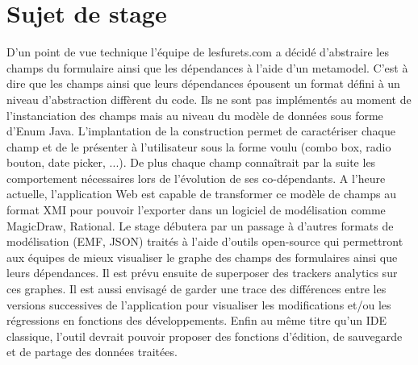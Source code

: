 \chapter{Sujet de stage}
D’un point de vue technique l’équipe de lesfurets.com a décidé d’abstraire les champs du formulaire ainsi que les dépendances à l’aide d'un metamodel. C'est à dire que les champs ainsi que leurs dépendances épousent un format défini à un niveau d'abstraction diffèrent du code. Ils ne sont pas implémentés au moment de l'instanciation des champs mais au niveau du modèle de données sous forme d'Enum Java. L'implantation de la construction permet de caractériser chaque champ et de le présenter à l'utilisateur sous la forme voulu (combo box, radio bouton, date picker, ...). De plus chaque champ connaîtrait par la suite les comportement nécessaires lors de l'évolution de ses co-dépendants.  A l’heure actuelle, l’application Web est capable de transformer ce modèle de champs au format XMI pour pouvoir l'exporter dans un logiciel de modélisation comme MagicDraw, Rational. Le stage débutera par un passage à d’autres formats de modélisation (EMF, JSON) traités à l'aide d'outils open-source qui permettront aux équipes de mieux visualiser le graphe des champs des formulaires ainsi que leurs dépendances. Il est prévu ensuite de superposer des trackers analytics sur ces graphes. Il est aussi envisagé de garder une trace des différences entre les versions successives de l’application pour visualiser les modifications et/ou les régressions en fonctions des développements. Enfin au même titre qu’un IDE classique, l’outil devrait pouvoir proposer des fonctions d’édition, de sauvegarde et de partage des données traitées.

